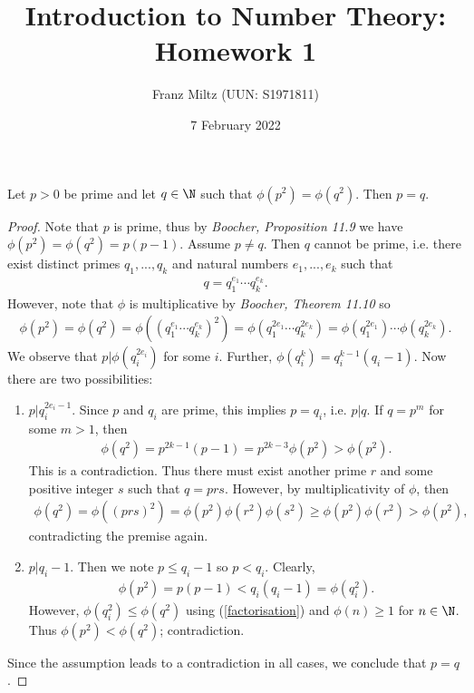 \documentclass{article}
\begin{document}
\title{Introduction to Number Theory: Homework 1}
\author{Franz Miltz (UUN: S1971811)}
\date{7 February 2022}
\maketitle

\begin{claim*}[1]
	Let $p>0$ be prime and let $q\in\N$ such that $\phi\left(p^2\right) = \phi\left(q^2\right)$.
	Then $p=q$.
	\begin{proof}
		Note that $p$ is prime, thus by \emph{Boocher, Proposition 11.9} we
		have $\phi\left(p^2\right)=\phi\left(q^2\right)=p(p-1)$. Assume $p\not= q$.
		Then $q$ cannot be prime, i.e. there exist distinct primes $q_1,...,q_k$ and natural
		numbers $e_1,...,e_k$ such that
		\begin{align*}
			q = q_1^{e_1}\cdots q_k^{e_k}.
		\end{align*}
		However, note that $\phi$ is multiplicative by \emph{Boocher, Theorem 11.10}
		so
		\begin{align}
			\label{factorisation}
			\phi(p^2)
			=\phi(q^2)
			=\phi\left(\left(q_1^{e_1}\cdots q_k^{e_k}\right)^2\right)
			=\phi\left(q_1^{2e_1}\cdots q_k^{2e_k}\right)
			=\phi\left(q_1^{2e_1}\right)\cdots\phi\left(q_k^{2e_k}\right).
		\end{align}
		We observe that $p|\phi\left(q_i^{2e_i}\right)$ for some $i$.
		Further, $\phi\left(q_i^k\right)=q_i^{k-1}(q_i-1)$. Now there are two possibilities:
		\begin{enumerate}
			\item $p|q_i^{2e_i-1}$. Since $p$ and $q_i$ are prime, this implies
			      $p=q_i$, i.e. $p|q$. If $q=p^m$ for some $m>1$, then \begin{align*}
				      \phi\left(q^2\right)=p^{2k-1}(p-1)=p^{2k-3}\phi\left(p^2\right)
				      >\phi\left(p^2\right).
			      \end{align*}
			      This is a contradiction. Thus there must exist another prime $r$ and some
			      positive integer $s$ such that $q=prs$. However, by multiplicativity of $\phi$,
			      then
			      \begin{align*}
				      \phi\left(q^2\right)
				      =    \phi\left((prs)^2\right)
				      =    \phi\left(p^2\right)\phi\left(r^2\right)\phi(s^2)
				      \geq \phi\left(p^2\right)\phi\left(r^2\right)
				      >    \phi\left(p^2\right) ,
			      \end{align*}
			      contradicting the premise again.
			\item $p|q_i-1$. Then we note $p\leq q_i-1$ so $p<q_i$.  Clearly,
			      \begin{align*}
				      \phi\left(p^2\right)=p(p-1)<q_i(q_i-1)=\phi\left(q_i^2\right).
			      \end{align*}
			      However, $\phi\left(q_i^2\right)\leq \phi\left(q^2\right)$ using
			      (\ref{factorisation}) and $\phi(n)\geq 1$ for $n\in\N$. Thus
			      $\phi\left(p^2\right)<\phi\left(q^2\right)$; contradiction.
		\end{enumerate}
		Since the assumption leads to a contradiction in all cases, we conclude
		that $p=q$.
	\end{proof}
\end{claim*}
\end{document}
